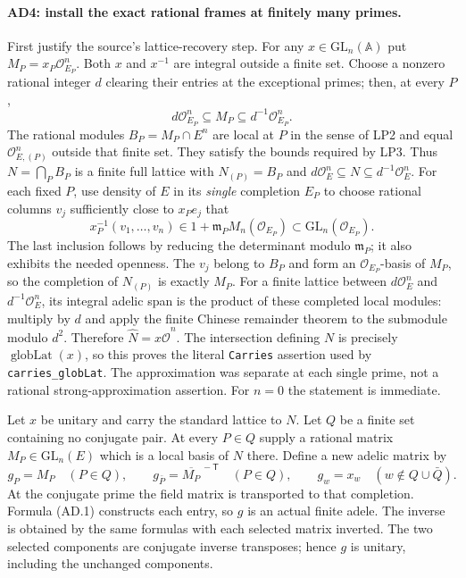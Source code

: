 \paragraph{AD4: install the exact rational frames at finitely many primes.}
First justify the source's lattice-recovery step. For any
$x\in\mathrm{GL}_n(\mathbb A)$ put
$M_P=x_P\mathcal O_{E_P}^n$. Both $x$ and $x^{-1}$ are integral
outside a finite set. Choose a nonzero rational integer $d$ clearing
their entries at the exceptional primes; then, at every $P$,
\[
 d\mathcal O_{E_P}^n\subseteq M_P\subseteq d^{-1}\mathcal O_{E_P}^n.
                                                               \tag{AD.13}
\]
The rational modules $B_P=M_P\cap E^n$ are local at $P$ in the
sense of LP2 and equal $\mathcal O_{E,(P)}^n$ outside that finite
set. They satisfy the bounds required by LP3. Thus
$N=\bigcap_P B_P$ is a finite full lattice with
$N_{(P)}=B_P$ and $d\mathcal O_E^n\subseteq N\subseteq
d^{-1}\mathcal O_E^n$.
For each fixed $P$, use density of $E$ in its \emph{single}
completion $E_P$ to choose rational columns $v_j$ sufficiently
close to $x_Pe_j$ that
\[
             x_P^{-1}(v_1,\ldots,v_n)
                    \in 1+\mathfrak m_P M_n(\mathcal O_{E_P})
                    \subset\mathrm{GL}_n(\mathcal O_{E_P}).
                                                               \tag{AD.14}
\]
The last inclusion follows by reducing the determinant modulo
$\mathfrak m_P$; it also exhibits the needed openness.
The $v_j$ belong to $B_P$ and form an $\mathcal O_{E_P}$-basis
of $M_P$, so the completion of $N_{(P)}$ is exactly $M_P$.
For a finite lattice between $d\mathcal O_E^n$ and
$d^{-1}\mathcal O_E^n$, its integral adelic span is the product
of these completed local modules: multiply by $d$ and apply the
finite Chinese remainder theorem to the submodule modulo $d^2$.
Therefore $\widehat N=x\widehat{\mathcal O}^n$.
The intersection defining $N$ is precisely
$\operatorname{globLat}(x)$, so this proves the literal
\texttt{Carries} assertion used by \texttt{carries\_globLat}.
The approximation was separate at each single prime, not a
rational strong-approximation assertion. For $n=0$ the statement
is immediate.

Let $x$ be unitary and carry the standard lattice to $N$.
Let $Q$ be a finite set containing no conjugate pair.
At every $P\in Q$ supply a rational matrix $M_P\in
\mathrm{GL}_n(E)$ which is a local basis of $N$ there.
Define a new adelic matrix by
\[
 g_P=M_P\quad(P\in Q),\qquad
 g_{\bar P}=\overline{M_P}^{\,-\mathsf T}\quad(P\in Q),
 \qquad g_w=x_w\quad(w\notin Q\cup\bar Q).           \tag{AD.11}
\]
At the conjugate prime the field matrix is transported to that
completion. Formula (AD.1) constructs each entry, so $g$ is
an actual finite adele. The inverse is obtained by the same
formulas with each selected matrix inverted. The two selected
components are conjugate inverse transposes; hence $g$ is
unitary, including the unchanged components.

